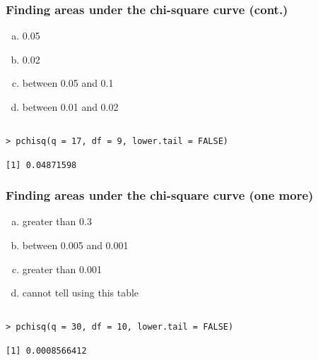 \documentclass[slidestop,compress,mathserif]{beamer}
\makeatletter
\def\chp6@path{../../Chp 6}
\makeatother
\begin{document}

\begin{frame}[fragile]
\frametitle{Finding areas under the chi-square curve (cont.)}


{
{\small
\begin{enumerate}[(a)]
\setlength{\itemsep}{0in}
\item 0.05
\item 0.02
\item between 0.05 and 0.1
\item between 0.01 and 0.02
\end{enumerate}
}
}

\pause

\begin{verbatim}

> pchisq(q = 17, df = 9, lower.tail = FALSE)

[1] 0.04871598

\end{verbatim}

\end{frame}


\begin{frame}[fragile]
\frametitle{Finding areas under the chi-square curve (one more)}


{
{\small
\begin{enumerate}[(a)]
\setlength{\itemsep}{0in}
\item greater than 0.3
\item between 0.005 and 0.001
\item greater than 0.001
\item cannot tell using this table
\end{enumerate}
}
}

\pause

\begin{verbatim}

> pchisq(q = 30, df = 10, lower.tail = FALSE)

[1] 0.0008566412

\end{verbatim}

\end{frame}
\end{document}
